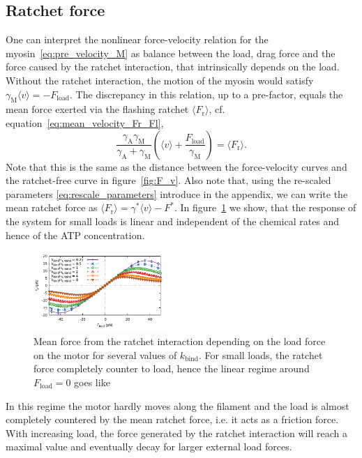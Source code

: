 \documentclass[aps,pre,twocolumn,showpacs,showkeys,superscriptaddress,floatfix]{revtex4-1}
\begin{document}
\subsection{Ratchet force} 
One can interpret the nonlinear force-velocity relation for the myosin~\eqref{eq:pre_velocity_M} as balance between the load, drag force and the force caused by the ratchet interaction, 
that intrinsically depends on the load. 
Without the ratchet interaction, the motion of the myosin would satisfy $ \gamma_\text{M}\langle v\rangle = -F_\text{load}$. 
The discrepancy in this relation, up to a pre-factor, equals the mean force exerted via the flashing ratchet $\langle F_\text{r}\rangle$, 
cf. equation~\eqref{eq:mean_velocity_Fr_Fl},
\begin{equation}
\frac{\gamma_\text{A}\gamma_\text{M}}{\gamma_\text{A} + \gamma_\text{M} } \left(\langle v \rangle + \frac{F_\text{load}}{\gamma_\text{M}}\right) = \langle F_\text{r} \rangle.
\label{eq:mean_ratchet_force}
\end{equation}
Note that this is the same as the distance between the force-velocity curves and the ratchet-free curve in figure~\ref{fig:F_v}. 
Also note that, using the re-scaled parameters \eqref{eq:rescale_parameters} introduce in the appendix, 
we can write the mean ratchet force as $\langle F_\text{r} \rangle = \gamma^* \langle v \rangle - F^*$.
In figure~\ref{fig:ratchet_force} we show, 
that the response of the system for small loads is linear and independent of the chemical rates and hence of the ATP concentration. 
\begin{figure}[t]
\centering
\includegraphics[width=0.45\textwidth,height=!]{ratchet_force}
\caption{
\label{fig:ratchet_force}
Mean force from the ratchet interaction depending on the load force on the motor for several values of $k_\text{bind}$. 
For small loads, the ratchet force completely counter to load, hence the linear regime around $F_\text{load}=0$ goes like
}
\end{figure}
In this regime the motor hardly moves along the filament and the load is almost completely countered by the mean ratchet force, i.e. it acts as a friction force.
With increasing load, the force generated by the ratchet interaction will reach a maximal value and eventually decay for larger external load forces. 
\end{document}
